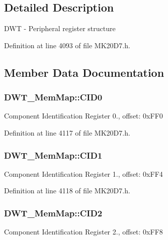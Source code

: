 \subsection{Detailed Description}
D\+WT -\/ Peripheral register structure 

Definition at line 4093 of file M\+K20\+D7.\+h.



\subsection{Member Data Documentation}
\subsubsection[{\texorpdfstring{C\+I\+D0}{CID0}}]{ D\+W\+T\+\_\+\+Mem\+Map\+::\+C\+I\+D0}\hypertarget{struct_d_w_t___mem_map_aff62932c622d7a014e1a9be6c1ead135}{}\label{struct_d_w_t___mem_map_aff62932c622d7a014e1a9be6c1ead135}
Component Identification Register 0., offset\+: 0x\+F\+F0 

Definition at line 4117 of file M\+K20\+D7.\+h.

\subsubsection[{\texorpdfstring{C\+I\+D1}{CID1}}]{ D\+W\+T\+\_\+\+Mem\+Map\+::\+C\+I\+D1}\hypertarget{struct_d_w_t___mem_map_a023bb3d410c13c5bd75ed9aedb0aed98}{}\label{struct_d_w_t___mem_map_a023bb3d410c13c5bd75ed9aedb0aed98}
Component Identification Register 1., offset\+: 0x\+F\+F4 

Definition at line 4118 of file M\+K20\+D7.\+h.

\subsubsection[{\texorpdfstring{C\+I\+D2}{CID2}}]{ D\+W\+T\+\_\+\+Mem\+Map\+::\+C\+I\+D2}\hypertarget{struct_d_w_t___mem_map_a79b7746489031d3b49004e1b2c400501}{}\label{struct_d_w_t___mem_map_a79b7746489031d3b49004e1b2c400501}
Component Identification Register 2., offset\+: 0x\+F\+F8 

